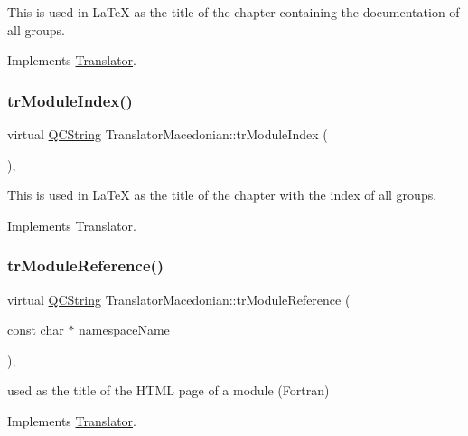 This is used in La\+TeX as the title of the chapter containing the documentation of all groups. 

Implements \mbox{\hyperlink{class_translator}{Translator}}.

\mbox{\label{class_translator_macedonian_a5518771e4db4f1dbb5c9b12c5893df1e}} 
\subsubsection{\texorpdfstring{trModuleIndex()}{trModuleIndex()}}
{\footnotesize\ttfamily virtual \mbox{\hyperlink{class_q_c_string}{Q\+C\+String}} Translator\+Macedonian\+::tr\+Module\+Index (\begin{DoxyParamCaption}{ }\end{DoxyParamCaption})\hspace{0.3cm}{\ttfamily [inline]}, {\ttfamily [virtual]}}

This is used in La\+TeX as the title of the chapter with the index of all groups. 

Implements \mbox{\hyperlink{class_translator}{Translator}}.

\mbox{\label{class_translator_macedonian_a5a6950225b0ca175a9769651a30f6c88}} 
\subsubsection{\texorpdfstring{trModuleReference()}{trModuleReference()}}
{\footnotesize\ttfamily virtual \mbox{\hyperlink{class_q_c_string}{Q\+C\+String}} Translator\+Macedonian\+::tr\+Module\+Reference (\begin{DoxyParamCaption}\item[{const char $\ast$}]{namespace\+Name }\end{DoxyParamCaption})\hspace{0.3cm}{\ttfamily [inline]}, {\ttfamily [virtual]}}

used as the title of the H\+T\+ML page of a module (Fortran) 

Implements \mbox{\hyperlink{class_translator}{Translator}}.

